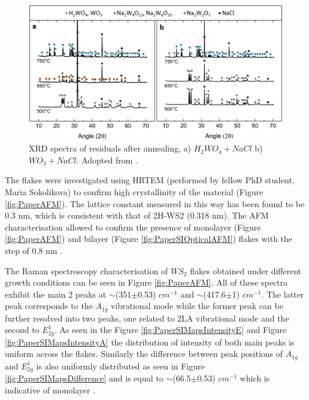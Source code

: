 \begin{figure}[h]
	\begin{center}
		\includegraphics[scale=0.3]{PaperSIXRD.png}
		\caption{XRD spectra of residuals after annealing, a) $H_2WO_4+NaCl$ b) $WO_3+NaCl$. Adopted from \cite{Reale2017}.}
		\label{fig:PaperSIXRD}
	\end{center}
\end{figure}

The flakes were investigated using HRTEM (performed by fellow PhD student, Maria Sokolikova) to confirm high crystallinity of the material (Figure \ref{fig:PaperAFM}). The lattice constant measured in this way has been found to be 0.3 nm, which is consistent with that of 2H-WS2 (0.318 nm). The AFM characterisation allowed to confirm the presence of monolayer (Figure \ref{fig:PaperAFM}) and bilayer (Figure \ref{fig:PaperSIOpticalAFM}) flakes with the step of 0.8 nm \cite{Wu2014}\cite{Rasmussen2015}.

The Raman spectroscopy characterisation of $WS_2$ flakes obtained under different growth conditions can be seen in Figure \ref{fig:PaperAFM}. All of these spectra exhibit the main 2 peaks at {$\sim$}(351{$\pm$}0.53) $cm^{−1}$ and {$\sim$}(417.6{$\pm$}1) $cm^{−1}$. The latter peak corresponds to the $A_{1g}$ vibrational mode while the former peak can be further resolved into two peaks, one related to 2LA vibrational mode and the second to $E^1_{2g}$. As seen in the Figure \ref{fig:PaperSIMapsIntensityE} and Figure \ref{fig:PaperSIMapsIntensityA} the distribution of intensity of both main peaks is uniform across the flakes. Similarly the difference between peak positions of $A_{1g}$ and $E^1_{2g}$ is also uniformly distributed as seen in Figure \ref{fig:PaperSIMapsDifference} and is equal to {$\sim$}(66.5{$\pm$}0.53) $cm^{−1}$ which is indicative of monolayer \cite{Withers2014}.

